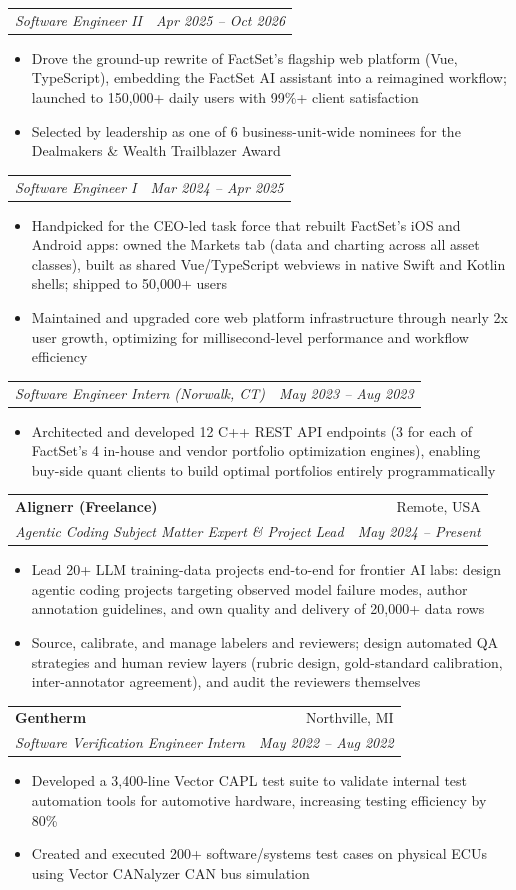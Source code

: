 \documentclass[letterpaper,11pt]{article}
\makeatletter
\newcommand{\resumeItem}[1]{
  \item\small{
    {#1 \vspace{-2pt}}
  }
}
\newcommand{\resumeSubheading}[4]{
  \vspace{-2pt}\item
    \begin{tabular*}{0.97\textwidth}[t]{l@{\extracolsep{\fill}}r}
      \textbf{#1} & #2 \\
      \textit{\small#3} & \textit{\small #4} \\
    \end{tabular*}\vspace{-7pt}
}
\newcommand{\resumeSubSubheading}[2]{
    \item
    \begin{tabular*}{0.97\textwidth}{l@{\extracolsep{\fill}}r}
      \textit{\small#1} & \textit{\small #2} \\
    \end{tabular*}\vspace{-7pt}
}
\newcommand{\resumeItemListStart}{\begin{itemize}}
\newcommand{\resumeItemListEnd}{\end{itemize}\vspace{-5pt}}
\makeatother
\begin{document}
    \resumeSubSubheading
      {Software Engineer II}{Apr 2025 -- Oct 2026}
      \resumeItemListStart
        \resumeItem{Drove the ground-up rewrite of FactSet's flagship web platform (Vue, TypeScript), embedding the FactSet AI assistant into a reimagined workflow; launched to 150,000+ daily users with 99\%+ client satisfaction}
        \resumeItem{Selected by leadership as one of 6 business-unit-wide nominees for the Dealmakers \& Wealth Trailblazer Award}
      \resumeItemListEnd

    \resumeSubSubheading
      {Software Engineer I}{Mar 2024 -- Apr 2025}
      \resumeItemListStart
        \resumeItem{Handpicked for the CEO-led task force that rebuilt FactSet's iOS and Android apps: owned the Markets tab (data and charting across all asset classes), built as shared Vue/TypeScript webviews in native Swift and Kotlin shells; shipped to 50,000+ users}
        \resumeItem{Maintained and upgraded core web platform infrastructure through nearly 2x user growth, optimizing for millisecond-level performance and workflow efficiency}
      \resumeItemListEnd

    \resumeSubSubheading
      {Software Engineer Intern (Norwalk, CT)}{May 2023 -- Aug 2023}
      \resumeItemListStart
        \resumeItem{Architected and developed 12 C++ REST API endpoints (3 for each of FactSet's 4 in-house and vendor portfolio optimization engines), enabling buy-side quant clients to build optimal portfolios entirely programmatically}
      \resumeItemListEnd

    \resumeSubheading
      {Alignerr (Freelance)}{Remote, USA}
      {Agentic Coding Subject Matter Expert \& Project Lead}{May 2024 -- Present}
      \resumeItemListStart
        \resumeItem{Lead 20+ LLM training-data projects end-to-end for frontier AI labs: design agentic coding projects targeting observed model failure modes, author annotation guidelines, and own quality and delivery of 20,000+ data rows}
        \resumeItem{Source, calibrate, and manage labelers and reviewers; design automated QA strategies and human review layers (rubric design, gold-standard calibration, inter-annotator agreement), and audit the reviewers themselves}
      \resumeItemListEnd

    \resumeSubheading
      {Gentherm}{Northville, MI}
      {Software Verification Engineer Intern}{May 2022 -- Aug 2022}
      \resumeItemListStart
        \resumeItem{Developed a 3,400-line Vector CAPL test suite to validate internal test automation tools for automotive hardware, increasing testing efficiency by 80\%}
        \resumeItem{Created and executed 200+ software/systems test cases on physical ECUs using Vector CANalyzer CAN bus simulation}
      \resumeItemListEnd
\end{document}
